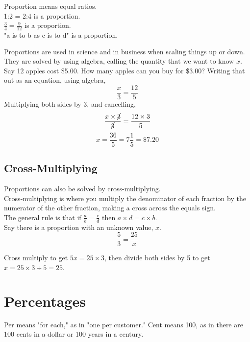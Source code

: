 \documentclass{article}
\begin{document}
\begin{spacing}{1.25}
Proportion means equal ratios.\\

1:2 = 2:4 is a proportion.\\

$\frac{3}{4}=\frac{9}{12}$ is a proportion.\\

"a is to b as c is to d" is a proportion.\\

\newpage

Proportions are used in science and in business when scaling things up or down. They are solved by using algebra, calling the quantity that we want to know $x.$\\

Say 12 apples cost \$5.00. How many apples can you buy for \$3.00? Writing that out as an equation, using algebra,
$$\frac{x}{3}=\frac{12}{5}$$
Multiplying both sides by 3, and cancelling,
$$\frac{x\times\cancel{3}}{\cancel{3}}=\frac{12\times3}{5}$$
$$x=\frac{36}{5}=7 \frac{1}{5}=\$7.20$$

\newpage

\subsection*{Cross-Multiplying}
Proportions can also be solved by cross-multiplying.\\

Cross-multiplying is where you multiply the denominator of each fraction by the numerator of the other fraction, making a cross across the equals sign.\\
The general rule is that if $\frac{a}{b}=\frac{c}{d}$ then $a\times d=c\times b$.\\

Say there is a proportion with an unknown value, $x$.\\
$$\frac{5}{3}=\frac{25}{x}$$

Cross multiply to get $5x=25\times3$, then divide both sides by 5 to get $x=25\times3\div5=25$.\\

\newpage

\section*{Percentages}

Per means "for each," as in "one per customer." Cent means 100, as in there are 100 cents in a dollar or 100 years in a century.\\


\end{spacing}
\end{document}
